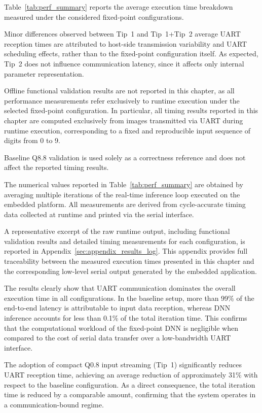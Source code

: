 Table~\ref{tab:perf_summary} reports the average execution time breakdown measured
under the considered fixed-point configurations.

Minor differences observed between Tip~1 and Tip~1+Tip~2 average UART reception
times are attributed to host-side transmission variability and UART scheduling
effects, rather than to the fixed-point configuration itself.
As expected, Tip~2 does not influence communication latency, since it affects
only internal parameter representation.


Offline functional validation results are not reported in this chapter, as all
performance measurements refer exclusively to runtime execution under the selected
fixed-point configuration.
In particular, all timing results reported in this chapter are computed exclusively
from images transmitted via UART during runtime execution, corresponding to a fixed
and reproducible input sequence of digits from 0 to 9.

Baseline Q8.8 validation is used solely as a correctness reference and does not
affect the reported timing results.


The numerical values reported in Table~\ref{tab:perf_summary} are obtained by
averaging multiple iterations of the real-time inference loop executed on the
embedded platform.
All measurements are derived from cycle-accurate timing data collected at runtime
and printed via the serial interface.

A representative excerpt of the raw runtime output, including functional
validation results and detailed timing measurements for each configuration, is
reported in Appendix~\ref{sec:appendix_results_log}.
This appendix provides full traceability between the measured execution times
presented in this chapter and the corresponding low-level serial output generated
by the embedded application.


The results clearly show that UART communication dominates the overall execution
time in all configurations.
In the baseline setup, more than 99\% of the end-to-end latency is attributable to
input data reception, whereas DNN inference accounts for less than 0.1\% of the
total iteration time.
This confirms that the computational workload of the fixed-point DNN is negligible
when compared to the cost of serial data transfer over a low-bandwidth UART
interface.

The adoption of compact Q0.8 input streaming (Tip~1) significantly reduces UART
reception time, achieving an average reduction of approximately 31\% with respect
to the baseline configuration.
As a direct consequence, the total iteration time is reduced by a comparable
amount, confirming that the system operates in a communication-bound regime.

